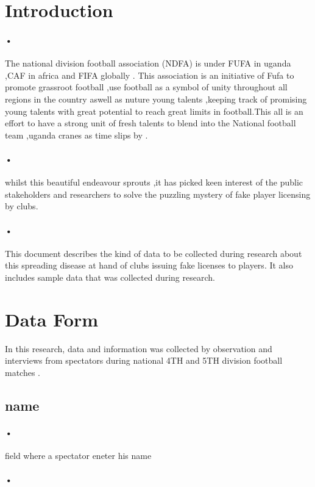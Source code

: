 \documentclass[12pt]{article}
\begin{document}
\section{Introduction}
\paragraph{•}
The national division football association (NDFA) is under FUFA in uganda ,CAF in africa and FIFA globally . This association is an initiative of Fufa to promote grassroot football ,use football  as a symbol of unity throughout all regions in the country aswell as nuture young talents ,keeping track of promising young talents with great potential to reach great limits in football.This all is an effort to have a strong unit of fresh talents to blend into the National football team ,uganda cranes as time slips by .

\paragraph{•}
whilst this beautiful endeavour sprouts ,it has picked keen interest of the public stakeholders and researchers to solve the puzzling mystery of fake player licensing by clubs.
\paragraph{•}
This document describes the kind of data to be collected during research about this spreading disease at hand of clubs issuing fake licenses to players. It also includes sample data that was collected during research.

\section{Data Form}
In this research, data and information was collected by observation and interviews from spectators during national 4TH and 5TH  division football matches  .
\subsection{name }
\paragraph{•}
field where a spectator eneter his name 
\paragraph{•}
\end{document}

